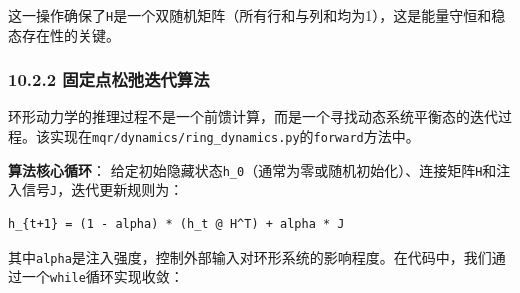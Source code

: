 \documentclass[
  12pt,
]{article}
\begin{document}
这一操作确保了\texttt{H}是一个双随机矩阵（所有行和与列和均为1），这是能量守恒和稳态存在性的关键。

\hypertarget{ux56faux5b9aux70b9ux677eux5f1bux8fedux4ee3ux7b97ux6cd5}{%
\subsubsection{10.2.2
固定点松弛迭代算法}\label{ux56faux5b9aux70b9ux677eux5f1bux8fedux4ee3ux7b97ux6cd5}}

环形动力学的推理过程不是一个前馈计算，而是一个寻找动态系统平衡态的迭代过程。该实现在\texttt{mqr/dynamics/ring\_dynamics.py}的\texttt{forward}方法中。

\textbf{算法核心循环}：
给定初始隐藏状态\texttt{h\_0}（通常为零或随机初始化）、连接矩阵\texttt{H}和注入信号\texttt{J}，迭代更新规则为：

\begin{verbatim}
h_{t+1} = (1 - alpha) * (h_t @ H^T) + alpha * J
\end{verbatim}

其中\texttt{alpha}是注入强度，控制外部输入对环形系统的影响程度。在代码中，我们通过一个\texttt{while}循环实现收敛：
\end{document}
